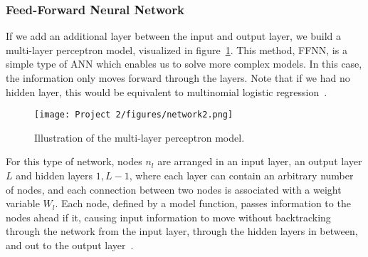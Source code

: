 \documentclass[english,notitlepage,reprint,nofootinbib]{revtex4-2}  %
\begin{document}
\subsubsection*{Feed-Forward Neural Network}
If we add an additional layer between the input and output layer, we build a multi-layer perceptron model, visualized in figure~\ref{fig: Multi Layer Perceptron Model}. This method, FFNN, is a simple type of ANN which enables us to solve more complex models. In this case, the information only moves forward through the layers. %
Note that if we had no hidden layer, this would be equivalent to multinomial logistic regression~\cite{friedman}. 

\begin{figure}[h!]
    \centering %
    \texttt{[image: Project 2/figures/network2.png]} 
    \caption{Illustration of the multi-layer perceptron model.}
    \label{fig: Multi Layer Perceptron Model}
\end{figure}

For this type of network, nodes $n_l$ are arranged in an input layer, an output layer $L$ and hidden layers $1,L-1$, where each layer can contain an arbitrary number of nodes, and each connection between two nodes is associated with a weight variable $W_l$. 
Each node, defined by a model function, passes information to the nodes ahead if it, causing input information to move without backtracking through the network from the input layer, through the hidden layers in between, and out to the output layer~\cite{friedman}. 
\end{document}
